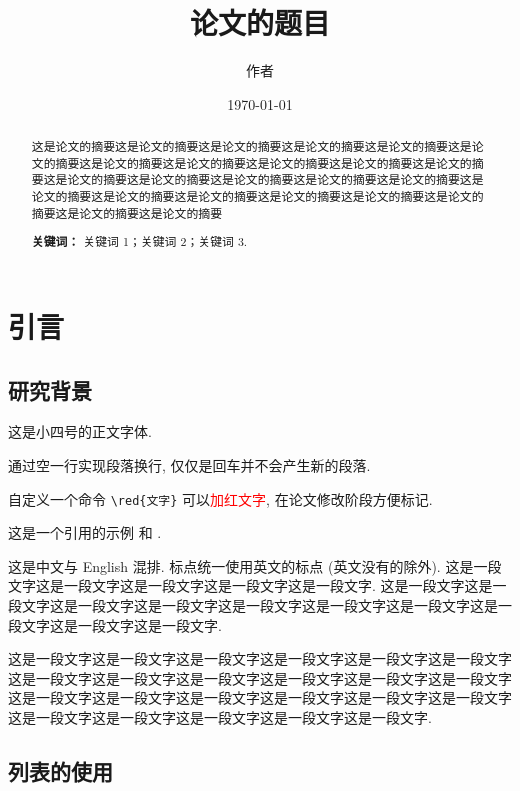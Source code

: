 \documentclass[zihao=-4]{ctexart}
\title{论文的题目}
\author{作者}
\date{\today}
\numberwithin{equation}{section}
\numberwithin{figure}{section}
\numberwithin{table}{section}
\theoremstyle{plain}
\newcommand{\red}[1]{\textcolor{red}{#1}}
\begin{document}
\maketitle

\begin{abstract}
这是论文的摘要这是论文的摘要这是论文的摘要这是论文的摘要这是论文的摘要这是论文的摘要这是论文的摘要这是论文的摘要这是论文的摘要这是论文的摘要这是论文的摘要这是论文的摘要这是论文的摘要这是论文的摘要这是论文的摘要这是论文的摘要这是论文的摘要这是论文的摘要这是论文的摘要这是论文的摘要这是论文的摘要这是论文的摘要这是论文的摘要这是论文的摘要

\medskip
\noindent\textbf{关键词：} 关键词 1；关键词 2；关键词 3.
\end{abstract}





\section{引言}

\subsection{研究背景}

这是小四号的正文字体.

通过空一行实现段落换行, 仅仅是回车并不会产生新的段落.

自定义一个命令 \verb|\red{文字}| 可以\red{加红文字}, 在论文修改阶段方便标记.

这是一个引用的示例 \cite{Adams2003}和 \cite{Shen1994,Tadmor2012,TreWei2014}.

这是中文与 English 混排. 标点统一使用英文的标点 (英文没有的除外). 这是一段文字这是一段文字这是一段文字这是一段文字这是一段文字. 这是一段文字这是一段文字这是一段文字这是一段文字这是一段文字这是一段文字这是一段文字这是一段文字这是一段文字这是一段文字.

这是一段文字这是一段文字这是一段文字这是一段文字这是一段文字这是一段文字这是一段文字这是一段文字这是一段文字这是一段文字这是一段文字这是一段文字这是一段文字这是一段文字这是一段文字这是一段文字这是一段文字这是一段文字这是一段文字这是一段文字这是一段文字这是一段文字这是一段文字.

\subsection{列表的使用}
\end{document}
